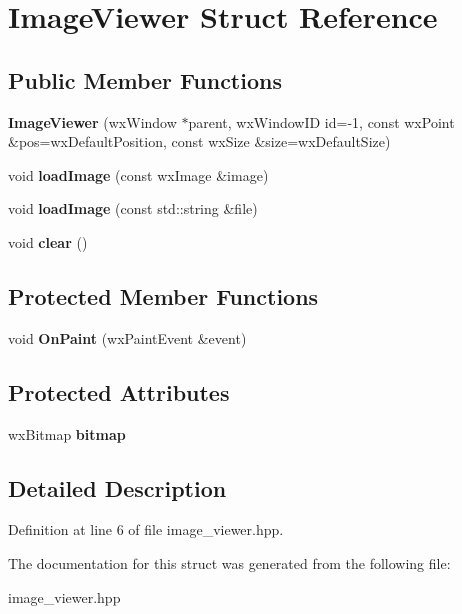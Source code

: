 \hypertarget{struct_image_viewer}{\section{Image\-Viewer Struct Reference}
\label{struct_image_viewer}
}
\subsection*{Public Member Functions}
\begin{DoxyCompactItemize}
\item 
\hypertarget{struct_image_viewer_a160db4ceca77d27ff007719cd5ca504d}{{\bfseries Image\-Viewer} (wx\-Window $\ast$parent, wx\-Window\-I\-D id=-\/1, const wx\-Point \&pos=wx\-Default\-Position, const wx\-Size \&size=wx\-Default\-Size)}\label{struct_image_viewer_a160db4ceca77d27ff007719cd5ca504d}

\item 
\hypertarget{struct_image_viewer_a82937676f4052088110e88fa912ba5f0}{void {\bfseries load\-Image} (const wx\-Image \&image)}\label{struct_image_viewer_a82937676f4052088110e88fa912ba5f0}

\item 
\hypertarget{struct_image_viewer_a2c58e9fcabf5a7f43fbc93b749ce67e5}{void {\bfseries load\-Image} (const std\-::string \&file)}\label{struct_image_viewer_a2c58e9fcabf5a7f43fbc93b749ce67e5}

\item 
\hypertarget{struct_image_viewer_a3f5a657ee79054ddc9252ac8cb1ce9ff}{void {\bfseries clear} ()}\label{struct_image_viewer_a3f5a657ee79054ddc9252ac8cb1ce9ff}

\end{DoxyCompactItemize}
\subsection*{Protected Member Functions}
\begin{DoxyCompactItemize}
\item 
\hypertarget{struct_image_viewer_a341a9a677b6838d24a180a22465a7200}{void {\bfseries On\-Paint} (wx\-Paint\-Event \&event)}\label{struct_image_viewer_a341a9a677b6838d24a180a22465a7200}

\end{DoxyCompactItemize}
\subsection*{Protected Attributes}
\begin{DoxyCompactItemize}
\item 
\hypertarget{struct_image_viewer_ac8e0ad9ed0c618e94eac8e1c13c6c7ab}{wx\-Bitmap {\bfseries bitmap}}\label{struct_image_viewer_ac8e0ad9ed0c618e94eac8e1c13c6c7ab}

\end{DoxyCompactItemize}


\subsection{Detailed Description}


Definition at line 6 of file image\-\_\-viewer.\-hpp.



The documentation for this struct was generated from the following file\-:\begin{DoxyCompactItemize}
\item 
image\-\_\-viewer.\-hpp\end{DoxyCompactItemize}
